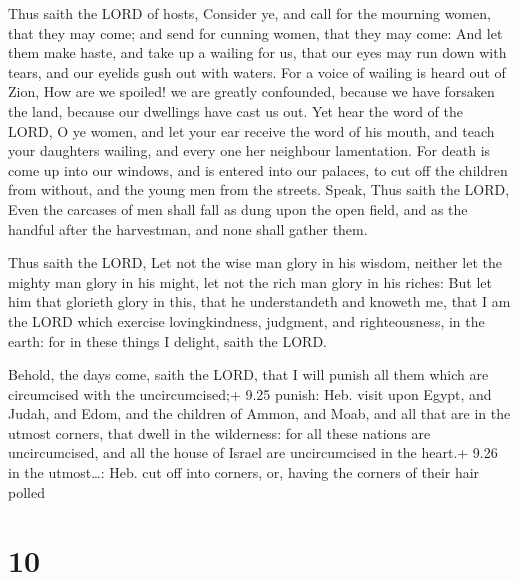  Thus saith the LORD of hosts, Consider ye, and call for
the mourning women, that they may come; and send for cunning women, that
they may come:  And let them make haste, and take up a
wailing for us, that our eyes may run down with tears, and our eyelids
gush out with waters.  For a voice of wailing is heard out
of Zion, How are we spoiled! we are greatly confounded, because we have
forsaken the land, because our dwellings have cast us out. 
Yet hear the word of the LORD, O ye women, and let your ear receive the
word of his mouth, and teach your daughters wailing, and every one her
neighbour lamentation.  For death is come up into our
windows, and is entered into our palaces, to cut off the children from
without, and the young men from the streets.  Speak, Thus
saith the LORD, Even the carcases of men shall fall as dung upon the
open field, and as the handful after the harvestman, and none shall
gather them.

 Thus saith the LORD, Let not the wise man glory in his
wisdom, neither let the mighty man glory in his might, let not the rich
man glory in his riches:  But let him that glorieth glory
in this, that he understandeth and knoweth me, that I am the LORD which
exercise lovingkindness, judgment, and righteousness, in the earth: for
in these things I delight, saith the LORD.

 Behold, the days come, saith the LORD, that I will
punish all them which are circumcised with the uncircumcised;+ 9.25
punish: Heb. visit upon  Egypt, and Judah, and Edom, and
the children of Ammon, and Moab, and all that are in the utmost corners,
that dwell in the wilderness: for all these nations are uncircumcised,
and all the house of Israel are uncircumcised in the heart.+ 9.26 in the
utmost\ldots: Heb. cut off into corners, or, having the corners of their
hair polled

\hypertarget{section-9}{%
\section{10}\label{section-9}}

